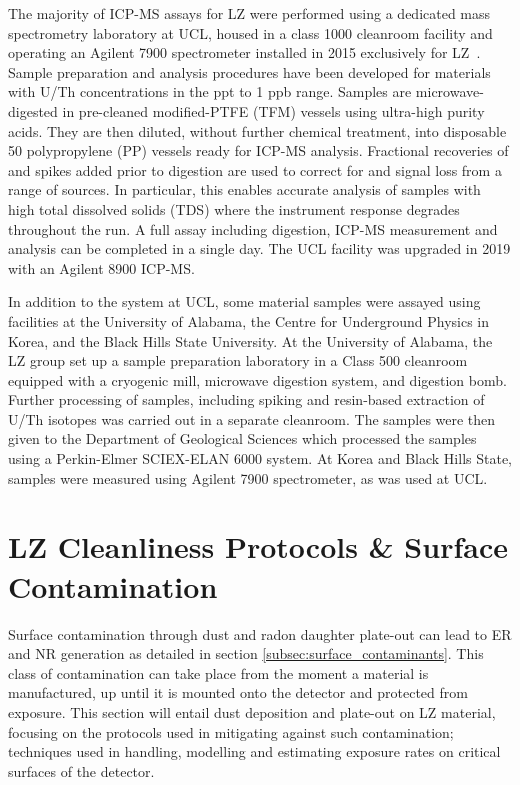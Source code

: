 The majority of ICP-MS assays for LZ were performed using a dedicated mass spectrometry laboratory at UCL, housed in a class 1000 cleanroom facility and operating an Agilent 7900 spectrometer installed in 2015 exclusively for LZ~\cite{icpms_ucl}. Sample preparation and analysis procedures have been developed for materials with U/Th concentrations in the ppt to 1 ppb range. Samples are microwave-digested in pre-cleaned modified-PTFE (TFM) vessels using ultra-high purity acids. They are then diluted, without further chemical treatment, into disposable 50 \milli{}\litre{} polypropylene (PP) vessels ready for ICP-MS analysis. Fractional recoveries of \thtTz{} and \utTT{} spikes added prior to digestion are used to correct for \thtTt{} and \utTe{} signal loss from a range of sources. In particular, this enables accurate analysis of samples with high total dissolved solids (TDS) where the instrument response degrades throughout the run. A full assay including digestion, ICP-MS measurement and analysis can be completed in a single day. The UCL facility was upgraded in 2019 with an Agilent 8900 ICP-MS. 

In addition to the system at UCL, some material samples were assayed using facilities at the University of Alabama, the  Centre for Underground Physics in Korea, and the Black Hills State University.  At the University of Alabama, the LZ group set up a sample preparation laboratory in a Class 500 cleanroom equipped with a cryogenic mill, microwave digestion system, and digestion bomb.  Further processing of samples, including spiking and resin-based extraction of U/Th isotopes was carried out in a separate cleanroom.  The samples were then given to the Department of Geological Sciences which processed the samples using a Perkin-Elmer SCIEX-ELAN 6000 system.  At Korea and Black Hills State, samples were measured using Agilent 7900 spectrometer, as was used at UCL.


\section{LZ Cleanliness Protocols \& Surface Contamination}
\label{sec:cleanliness}

Surface contamination through dust and radon daughter plate-out can lead to ER and NR generation as detailed in section \ref{subsec:surface_contaminants}. This class of contamination can take place from the moment a material is manufactured, up until it is mounted onto the detector and protected from exposure. This section will entail dust deposition and plate-out on LZ material, focusing on the protocols used in mitigating against such contamination; techniques used in handling, modelling and estimating exposure rates on critical surfaces of the detector.


